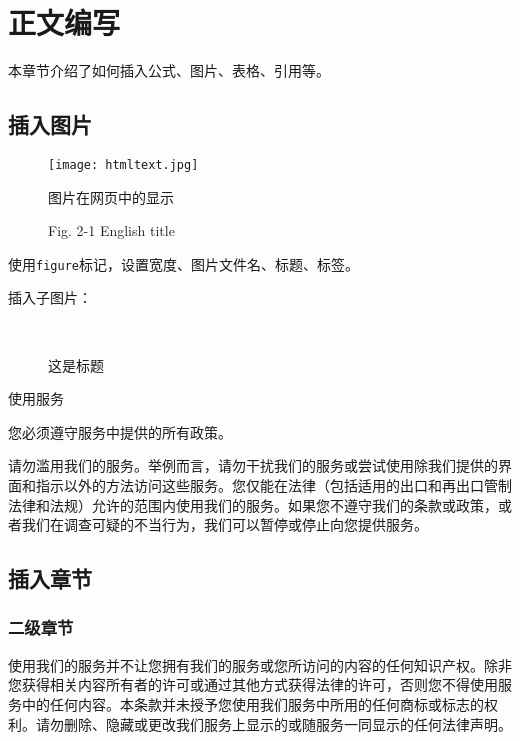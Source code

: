 \chapter{正文编写}

本章节介绍了如何插入公式、图片、表格、引用等。

\section{插入图片}

\begin{figure}[htbp]
\centering
\texttt{[image: htmltext.jpg]}
\caption{图片在网页中的显示}
\caption*{Fig. 2-1 English title}
\label{FIGhtmltext}
\end{figure}

使用\verb|figure|标记，设置宽度、图片文件名、标题、标签。

插入子图片：

\begin{figure}[htbp]
\centering
{}
~~
~~
\caption{这是标题}
\label{thisiisalabel}
\end{figure}

使用服务

您必须遵守服务中提供的所有政策。

请勿滥用我们的服务。举例而言，请勿干扰我们的服务或尝试使用除我们提供的界面和指示以外的方法访问这些服务。您仅能在法律（包括适用的出口和再出口管制法律和法规）允许的范围内使用我们的服务。如果您不遵守我们的条款或政策，或者我们在调查可疑的不当行为，我们可以暂停或停止向您提供服务。

\section{插入章节}

\subsection{二级章节}

使用我们的服务并不让您拥有我们的服务或您所访问的内容的任何知识产权。除非您获得相关内容所有者的许可或通过其他方式获得法律的许可，否则您不得使用服务中的任何内容。本条款并未授予您使用我们服务中所用的任何商标或标志的权利。请勿删除、隐藏或更改我们服务上显示的或随服务一同显示的任何法律声明。

